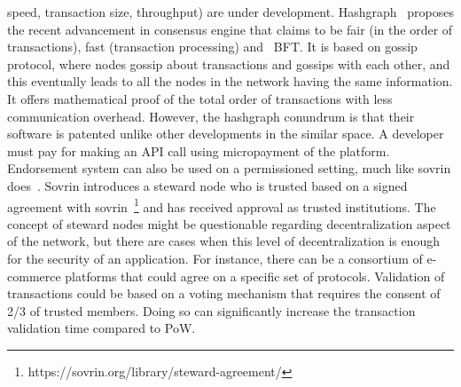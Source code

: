 speed, transaction size, throughput) are under development.
Hashgraph~\cite{baird2016hashgraph} proposes the recent advancement in
consensus engine that claims to be fair (in the order of transactions), fast
(transaction processing) and ~\ac{BFT}. It is based on gossip protocol, where
nodes gossip about transactions and gossips with each other, and this
eventually leads to all the nodes in the network having the same information.
It offers mathematical proof of the total order of transactions with less
communication overhead. However, the hashgraph conundrum is that their software
is patented unlike other developments in the similar space. A developer must
pay for making an API call using micropayment of the platform. Endorsement
system can also be used on a permissioned setting, much like sovrin
does~\cite{tobin2016inevitable}. Sovrin introduces a steward node who is
trusted based on a signed agreement with
sovrin~\footnote{https://sovrin.org/library/steward-agreement/} and has
received approval as trusted institutions. The concept of steward nodes might
be questionable regarding decentralization aspect of the network, but there are
cases when this level of decentralization is enough for the security of an
application. For instance, there can be a consortium of e-commerce platforms
that could agree on a specific set of protocols. Validation of transactions
could be based on a voting mechanism that requires the consent of 2/3 of
trusted members. Doing so can significantly increase the transaction validation
time compared to \ac{PoW}. 



